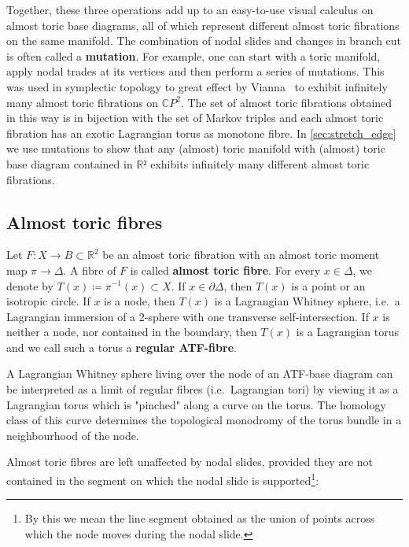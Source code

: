 \documentclass[12pt,a4paper,abstract=true,draft]{scrartcl}
\begin{document}
Together, these three operations add up to an easy-to-use visual calculus on almost toric base diagrams, all of which represent different almost toric fibrations on the same manifold.
The combination of nodal slides and changes in branch cut is often called a \textbf{mutation}.
For example, one can start with a toric manifold, apply nodal trades at its vertices and then perform a series of mutations.
This was used in symplectic topology to great effect by Vianna~\cite{Via16} to exhibit infinitely many almost toric fibrations on $\mathbb{C}P^2$.
The set of almost toric fibrations obtained in this way is in bijection with the set of Markov triples and each almost toric fibration has an exotic Lagrangian torus as monotone fibre.
In \cref{sec:stretch_edge} we use mutations to show that any (almost) toric manifold with (almost) toric base diagram contained in $ℝ²$ exhibits infinitely many different almost toric fibrations.

\subsection{Almost toric fibres}
\label{sec:atfibres}

Let $F \colon X \rightarrow B \subset \mathbb{R}^2$ be an almost toric fibration with an almost toric moment map $\pi \to \Delta$.
A fibre of $F$ is called \textbf{almost toric fibre}.
For every $x \in \Delta$, we denote by $T(x) ≔ π^{-1}(x) \subset X$.
If $x \in \partial \Delta$, then $T(x)$ is a point or an isotropic circle.
If $x$ is a node, then $T(x)$ is a Lagrangian Whitney sphere, i.e.\ a Lagrangian immersion of a $2$-sphere with one transverse self-intersection.
If $x$ is neither a node, nor contained in the boundary, then $T(x)$ is a Lagrangian torus and we call such a torus a \textbf{regular ATF-fibre}.

\begin{remark}
    \label{rk:pinchedtorus}
    A Lagrangian Whitney sphere living over the node of an ATF-base diagram can be interpreted as a limit of regular fibres (i.e.\ Lagrangian tori) by viewing it as a Lagrangian torus which is "pinched" along a curve on the torus.
The homology class of this curve determines the topological monodromy of the torus bundle in a neighbourhood of the node.
\end{remark}

Almost toric fibres are left unaffected by nodal slides, provided they are not contained in the segment on which the nodal slide is supported\footnote{By this we mean the line segment obtained as the union of points across which the node moves during the nodal slide.}:
\end{document}
